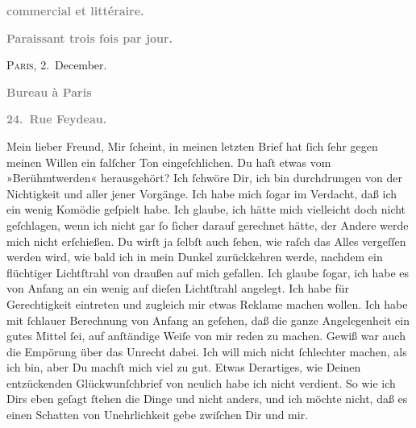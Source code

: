 \pstart
           \begin{otherlanguage}{french}\textcolor{gray}{\textbf{commercial et littéraire.}}\end{otherlanguage}\pend
           
\pstart
           \begin{otherlanguage}{french}\textcolor{gray}{\textbf{\textbf{Paraissant trois fois par jour.}}}\end{otherlanguage}\hfill \textsc{Paris}, 2. December.\pend
           
\pstart
           \begin{otherlanguage}{french}\textcolor{gray}{\textbf{\textbf{Bureau à Paris}}}\end{otherlanguage}\pend
           
\pstart
           \begin{otherlanguage}{french}\textcolor{gray}{\textbf{\textbf{24. Rue Feydeau.}}}\end{otherlanguage}\pend
           
\pstart\center{}Mein lieber Freund,\pend\vspace{0.5em}
\pstart
           Mir{ }ſcheint, in meinen letzten Brief hat{ }ſich{ }ſehr gegen meinen Willen ein falſcher
               Ton eingeſchlichen. Du haſt etwas vom »Berühmtwerden« herausgehört? Ich{ }ſchwöre Dir,
               ich bin durchdrungen von der Nichtigkeit und \label{K_L02794-1v}\label{K_L02794-1} aller jener Vorgänge. Ich habe mich{ }ſogar im Verdacht,
               daß ich ein  wenig Komödie geſpielt habe. Ich \strikeout{\textcolor{gray}{×}} glaube, ich hätte mich vielleicht doch nicht geſchlagen, wenn ich nicht gar{ }ſo{ }ſicher darauf gerechnet hätte, der Andere werde mich nicht erſchießen. Du wirſt ja{ }ſelbſt auch{ }ſehen, wie raſch das Alles vergeſſen werden {\pb}wird, wie bald ich in mein Dunkel zurückkehren
               werde, nachdem ein flüchtiger Lichtſtrahl von draußen auf mich gefallen. Ich glaube{ }ſogar, ich habe es von Anfang an ein wenig auf dieſen Lichtſtrahl angelegt. Ich habe
               für Gerechtigkeit eintreten und zugleich mir etwas  Reklame machen wollen. Ich habe mit{ }ſchlauer Berechnung von Anfang an
               geſehen, daß die ganze Angelegenheit ein gutes Mittel{ }ſei, auf anſtändige Weiſe von
               mir reden zu machen. Gewiß war auch die Empörung über das Unrecht dabei. Ich will
               mich nicht{ }ſchlechter machen, als ich bin, aber Du machſt {\pb}mich viel zu gut. Etwas Derartiges, wie Deinen
               entzückenden Glückwunſchbrief von neulich habe ich nicht verdient. So wie ich Dirs
               eben geſagt{ }ſtehen die Dinge und nicht anders, und ich möchte nicht, daß es einen
               Schatten von Unehrlichkeit gebe zwiſchen Dir und mir.\pend
           
